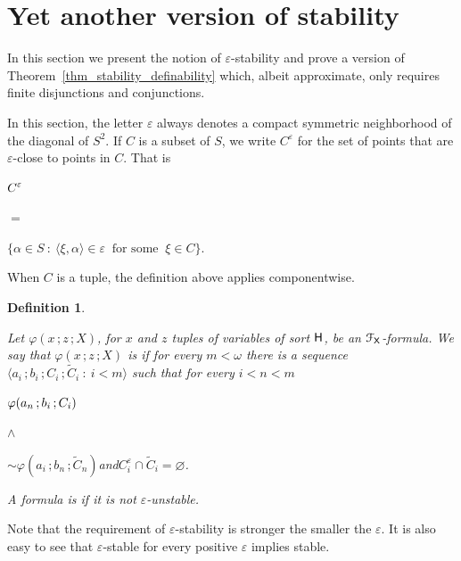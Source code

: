 \documentclass{amsproc}
\newcounter{thm}
\theoremstyle{mio}
\newtheorem{definition}[thm]{Definition}\tcolorboxenvironment{definition}{mythm}
\renewcommand*{\emph}[1]{%
   \smash{\tikz[baseline]\node[rectangle, fill=teal!25, rounded corners, inner xsep=0.5ex, inner ysep=0.2ex, anchor=base, minimum height = 2.7ex]{\strut #1};}}
\begin{document}
\section{Yet another version of stability}\label{epsilonstable}
\def\medrel#1{\parbox{5ex}{\hfil $#1$}}
\def\ceq#1#2#3{\parbox[t]{28ex}{$\displaystyle #1$}\medrel{#2}{$\displaystyle #3$}}

In this section we present the notion of $\varepsilon$-stability and prove a version of Theorem~\ref{thm_stability_definability} which, albeit approximate,  only requires finite disjunctions and conjunctions.

In this section, the letter $\varepsilon$ always denotes a compact symmetric neighborhood of the diagonal of $S^2$.
If $C$ is a subset of $S$, we write $C^\varepsilon$ for the set of points that are $\varepsilon$-close to points in $C$.
That is

\ceq{\hfill C^\varepsilon}{=}{\big\{\alpha\in S\ :\ \langle\xi,\alpha\rangle\in \varepsilon\ \text{ for some }\ \xi\in C\big\}.}

When $C$ is a tuple, the definition above applies componentwise.

\begin{definition}\label{def_epsilon_stable}\strut
  Let $\varphi(x\,;z\,;X)$, for $x$ and $z$ tuples of variables of sort ${\sf H}$, be an ${\EuScript F}_{\sf X}$-for\-mu\-la.
  We say that $\varphi(x\,;z\,;X)$ is \emph{$\varepsilon$-unstable\/} if for every $m<\omega$ there is a sequence $\langle a_i\,;b_i\,;C_i\,;\tilde C_i\ :\ i<m\rangle$ such that for every $i<n<m$\smallskip

    \ceq{\hfill \varphi(a_n\,;b_i\,;C_i)}{\wedge}{{\sim}\varphi(a_i\,;b_n\,;\tilde C_n)}\quad and\quad $C_i^\varepsilon\cap\tilde C_i=\varnothing$.\smallskip

  A formula is \emph{$\varepsilon$-stable\/} if it is not $\varepsilon$-unstable.  
\end{definition}

Note that the requirement of $\varepsilon$-stability is stronger the smaller the $\varepsilon$.
It is also easy to see that $\varepsilon$-stable for every positive $\varepsilon$ implies stable.
\end{document}
